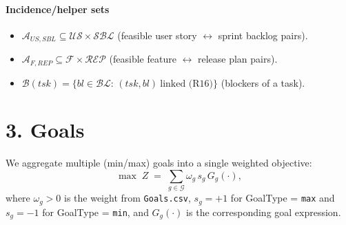 \documentclass[11pt,a4paper]{article}
\begin{document}
\paragraph{Incidence/helper sets}
\begin{itemize}
  \item $\mathcal{A}_{US,SBL}\subseteq \mathcal{US}\times\mathcal{SBL}$ (feasible user story $\leftrightarrow$ sprint backlog pairs).
  \item $\mathcal{A}_{F,REP}\subseteq \mathcal{F}\times\mathcal{REP}$ (feasible feature $\leftrightarrow$ release plan pairs).
  \item $\mathcal{B}(tsk)=\{bl\in\mathcal{BL}:\,(tsk,bl)\ \text{linked (R16)}\}$ (blockers of a task).
\end{itemize}

\section{3. Goals}
We aggregate multiple (min/max) goals into a single weighted objective:
\[
\max \; Z \;=\; \sum_{g\in\mathcal{G}} \omega_g\, s_g \, G_g(\cdot),
\]
where $\omega_g>0$ is the weight from \texttt{Goals.csv}, $s_g=+1$ for GoalType = \texttt{max} and $s_g=-1$ for GoalType = \texttt{min}, and $G_g(\cdot)$ is the corresponding goal expression.
\end{document}
